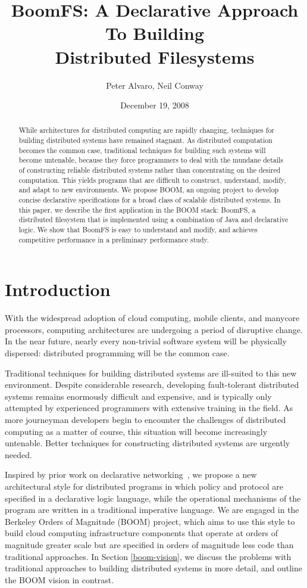\documentclass[twocolumn]{article}
\title{BoomFS: A Declarative Approach To Building\\Distributed Filesystems}
\author{Peter Alvaro, Neil Conway}
\date{December 19, 2008}
\begin{document}
\maketitle
\begin{abstract}
  While architectures for distributed computing are rapidly changing,
  techniques for building distributed systems have remained
  stagnant. As distributed computation becomes the common case,
  traditional techniques for building such systems will become
  untenable, because they force programmers to deal with the mundane
  details of constructing reliable distributed systems rather than
  concentrating on the desired computation. This yields programs that
  are difficult to construct, understand, modify, and adapt to new
  environments. We propose BOOM, an ongoing project to develop concise
  declarative specifications for a broad class of scalable distributed
  systems. In this paper, we describe the first application in the
  BOOM stack: BoomFS, a distributed filesystem that is implemented
  using a combination of Java and declarative logic. We show that
  BoomFS is easy to understand and modify, and achieves competitive
  performance in a preliminary performance study.
\end{abstract}
\section{Introduction}
\label{introduction}
With the widespread adoption of cloud computing, mobile clients, and
manycore processors, computing architectures are undergoing a period
of disruptive change. In the near future, nearly every non-trivial
software system will be physically dispersed: distributed programming
will be the common case.

Traditional techniques for building distributed systems are ill-suited
to this new environment. Despite considerable research, developing
fault-tolerant distributed systems remains enormously difficult and
expensive, and is typically only attempted by experienced programmers
with extensive training in the field. As more journeyman developers
begin to encounter the challenges of distributed computing as a matter
of course, this situation will become increasingly untenable. Better
techniques for constructing distributed systems are urgently needed.

Inspired by prior work on declarative networking~\cite{dn-sigmod,
  network-data-indep}, we propose a new architectural style for
distributed programs in which policy and protocol are specified in a
declarative logic language, while the operational mechanisms of the
program are written in a traditional imperative language. We are
engaged in the Berkeley Orders of Magnitude (BOOM) project, which aims
to use this style to build cloud computing infrastructure components
that operate at orders of magnitude greater scale but are specified in
orders of magnitude less code than traditional approaches. In Section
\ref{boom-vision}, we discuss the problems with traditional approaches
to building distributed systems in more detail, and outline the BOOM
vision in contrast.
\end{document}
